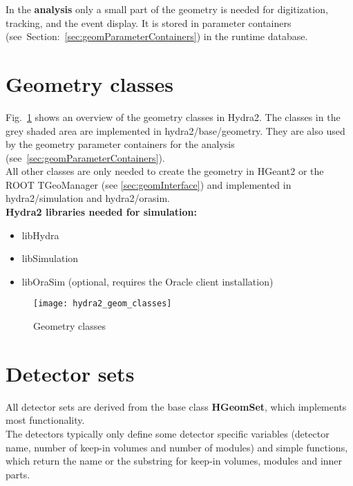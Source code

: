 In the \textbf{analysis} only a small part of the geometry is needed for  digitization, tracking, and the event 
display. It is stored in parameter containers (see~Section:~\ref{sec:geomParameterContainers}) in the runtime database.


\section[Geometry classes]{Geometry classes} \label{sec:geometryClasses}

Fig.~\ref{fig:geomClasses} shows an overview of the geometry classes in Hydra2. The classes in the grey shaded area are 
implemented in hydra2/base/geometry. They are also used by the geometry parameter containers for the 
analysis (see~\ref{sec:geomParameterContainers}).\\

All other classes are only needed to create the geometry in HGeant2 or the ROOT TGeoManager (see \ref{sec:geomInterface}) 
and implemented in hydra2/simulation and hydra2/orasim.\\

\textbf{Hydra2 libraries needed for simulation:}
\begin{itemize}
  \setlength{\itemsep}{0pt}    
  \item libHydra
  \item libSimulation
  \item libOraSim (optional, requires the Oracle client installation)
\end{itemize}

\begin{figure}[\htb]
  \centering
  \texttt{[image: hydra2\_geom\_classes]}
  \caption[Geometry classes]{Geometry classes} \label{fig:geomClasses}
\end{figure}


\section[Detector sets]{Detector sets} \label{sec:geomDetectorSets}

All detector sets are derived from the base class \textbf{HGeomSet}, which implements most functionality.\\
The detectors typically only define some detector specific variables (detector name, number of keep-in volumes and number 
of modules) and simple functions, which return the name or the substring for keep-in volumes, modules and inner parts.\\

